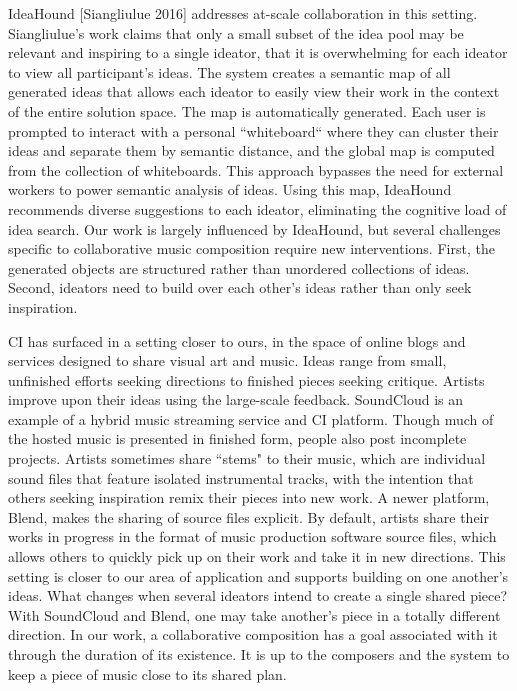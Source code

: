 \documentclass[final,authoryear,11pt,times]{elsarticle}
\begin{document}
IdeaHound [Siangliulue 2016] addresses at-scale collaboration in this setting. Siangliulue's work claims that only a small subset of the idea pool may be relevant and inspiring to a single ideator, that it is overwhelming for each ideator to view all participant's ideas. The system creates a semantic map of all generated ideas that allows each ideator to easily view their work in the context of the entire solution space. The map is automatically generated. Each user is prompted to interact with a personal ``whiteboard`` where they can cluster their ideas and separate them by semantic distance, and the global map is computed from the collection of whiteboards. This approach bypasses the need for external workers to power semantic analysis of ideas.  Using this map, IdeaHound recommends diverse suggestions to each ideator, eliminating the cognitive load of idea search. Our work is largely influenced by IdeaHound, but several challenges specific to collaborative music composition require new interventions. First, the generated objects are structured rather than unordered collections of ideas. Second, ideators need to build over each other's ideas rather than only seek inspiration.

CI has surfaced in a setting closer to ours, in the space of online blogs and services designed to share visual art and music. Ideas range from small, unfinished efforts seeking directions to finished pieces seeking critique. Artists improve upon their ideas using the large-scale feedback. SoundCloud is an example of a hybrid music streaming service and CI platform. Though much of the hosted music is presented in finished form, people also post incomplete projects. Artists sometimes share ``stems" to their music, which are individual sound files that feature isolated instrumental tracks, with the intention that others seeking inspiration remix their pieces into new work. A newer platform, Blend, makes the sharing of source files explicit. By default, artists share their works in progress in the format of music production software source files, which allows others to quickly pick up on their work and take it in new directions. This setting is closer to our area of application and supports building on one another's ideas.  What changes when several ideators intend to create a single shared piece? With SoundCloud and Blend, one may take another's piece in a totally different direction. In our work, a collaborative composition has a goal associated with it through the duration of its existence. It is up to the composers and the system to keep a piece of music close to its shared plan.
\end{document}
